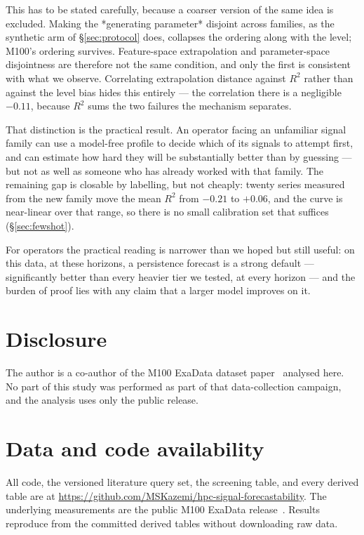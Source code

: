 \documentclass[11pt,a4paper]{article}
\begin{document}
This has to be stated carefully, because a coarser version of the same idea is
excluded. Making the *generating parameter* disjoint across families, as the
synthetic arm of \S\ref{sec:protocol} does, collapses the ordering along with
the level; M100's ordering survives. Feature-space extrapolation and
parameter-space disjointness are therefore not the same condition, and only the
first is consistent with what we observe. Correlating extrapolation distance
against \(R^2\) rather than against the level bias hides this entirely --- the
correlation there is a negligible \(-0.11\), because \(R^2\) sums the two
failures the mechanism separates.

That distinction is the practical result. An operator facing an unfamiliar
signal family can use a model-free profile to decide which of its signals to
attempt first, and can estimate how hard they will be substantially better than
by guessing --- but not as well as someone who has already worked with that
family. The remaining gap is closable by labelling, but not cheaply: twenty
series measured from the new family move the mean \(R^2\) from \(-0.21\) to
\(+0.06\), and the curve is near-linear over that range, so there is no small
calibration set that suffices (\S\ref{sec:fewshot}).

For operators the practical reading is narrower than we hoped but still useful:
on this data, at these horizons, a persistence forecast is a strong default ---
significantly better than every heavier tier we tested, at every horizon --- and
the burden of proof lies with any claim that a larger model improves on it.

\section*{Disclosure}

The author is a co-author of the M100 ExaData dataset paper~\citep{borghesi2023m100}
analysed here. No part of this study was performed as part of that data-collection
campaign, and the analysis uses only the public release.

\section*{Data and code availability}

All code, the versioned literature query set, the screening table, and every
derived table are at
\url{https://github.com/MSKazemi/hpc-signal-forecastability}. The underlying
measurements are the public M100 ExaData release~\citep{borghesi2023m100}.
Results reproduce from the committed derived tables without downloading raw
data.



\end{document}
